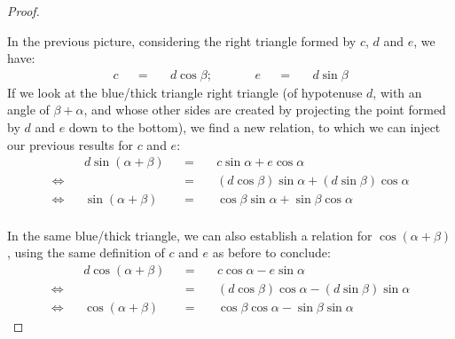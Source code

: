 \documentclass[solutions.tex]{subfiles}
\renewcommand{\bm}[1]{\pmb{#1}}
\begin{document}
\begin{proof}
\begin{figure}[H]
\end{figure}
In the previous picture, considering the right triangle formed by $c$, $d$
and $e$, we have:
\begin{equation*} \begin{aligned}
	c &&=\quad& d\cos\beta; &&\quad& e &&=\quad& d\sin\beta
\end{aligned} \end{equation*}
If we look at the blue/thick triangle right triangle (of hypotenuse
$d$, with an angle of $\beta+\alpha$, and whose other sides are
created by projecting the point formed by $d$ and $e$ down to the
bottom), we find a new relation, to which we can inject our previous
results for $c$ and $e$:
\begin{equation*} \begin{aligned}
	~ && d\sin(\alpha+\beta) &&=\quad& c\sin\alpha+e\cos\alpha \\
	\Leftrightarrow && ~ &&=\quad& (d\cos\beta)\sin\alpha+(d\sin\beta)\cos\alpha \\
	\Leftrightarrow && \sin(\alpha+\beta) &&=\quad& \boxed{\cos\beta\sin\alpha+\sin\beta\cos\alpha}
\end{aligned} \end{equation*}\\
In the same blue/thick triangle, we can also establish a relation
for $\cos(\alpha+\beta)$, using the same definition of $c$ and $e$
as before to conclude:
\begin{equation*} \begin{aligned}
	~ && d\cos(\alpha+\beta) &&=\quad& c\cos\alpha-e\sin\alpha \\
	\Leftrightarrow && ~ &&=\quad& (d\cos\beta)\cos\alpha-(d\sin\beta)\sin\alpha \\
	\Leftrightarrow && \cos(\alpha+\beta) &&=\quad& \boxed{\cos\beta\cos\alpha-\sin\beta\sin\alpha}
\end{aligned} \end{equation*}

\end{proof}
\end{document}
